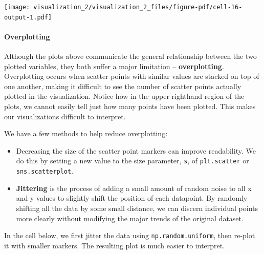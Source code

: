 \documentclass[
  letterpaper,
  DIV=11,
  numbers=noendperiod]{scrreprt}
\let\oldparagraph\paragraph
\renewcommand{\paragraph}[1]{\oldparagraph{#1}\mbox{}}
\providecommand{\tightlist}{%
  \setlength{\itemsep}{0pt}\setlength{\parskip}{0pt}}\usepackage{longtable,booktabs,array}
\begin{document}
\texttt{[image: visualization\_2/visualization\_2\_files/figure-pdf/cell-16-output-1.pdf]}

\paragraph{Overplotting}\label{overplotting}

Although the plots above communicate the general relationship between
the two plotted variables, they both suffer a major limitation --
\textbf{overplotting}. Overplotting occurs when scatter points with
similar values are stacked on top of one another, making it difficult to
see the number of scatter points actually plotted in the visualization.
Notice how in the upper righthand region of the plots, we cannot easily
tell just how many points have been plotted. This makes our
visualizations difficult to interpret.

We have a few methods to help reduce overplotting:

\begin{itemize}
\tightlist
\item
  Decreasing the size of the scatter point markers can improve
  readability. We do this by setting a new value to the size parameter,
  \texttt{s}, of \texttt{plt.scatter} or \texttt{sns.scatterplot}.
\item
  \textbf{Jittering} is the process of adding a small amount of random
  noise to all x and y values to slightly shift the position of each
  datapoint. By randomly shifting all the data by some small distance,
  we can discern individual points more clearly without modifying the
  major trends of the original dataset.
\end{itemize}

In the cell below, we first jitter the data using
\texttt{np.random.uniform}, then re-plot it with smaller markers. The
resulting plot is much easier to interpret.
\end{document}
